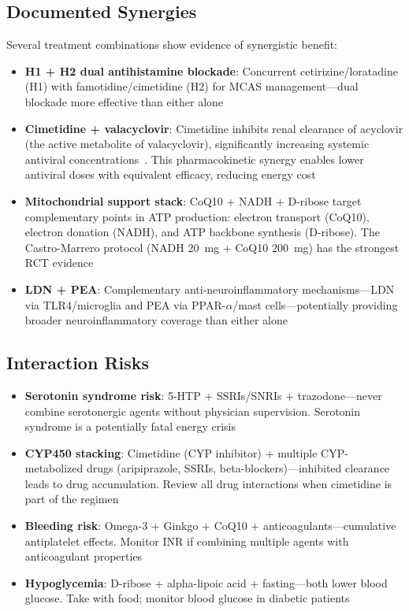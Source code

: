 \subsection{Documented Synergies}

Several treatment combinations show evidence of synergistic benefit:

\begin{itemize}
    \item \textbf{H1 + H2 dual antihistamine blockade}: Concurrent cetirizine/loratadine (H1) with famotidine/cimetidine (H2) for MCAS management---dual blockade more effective than either alone
    \item \textbf{Cimetidine + valacyclovir}: Cimetidine inhibits renal clearance of acyclovir (the active metabolite of valacyclovir), significantly increasing systemic antiviral concentrations~\cite{Stuijt2026CimetidineAcyclovir}. This pharmacokinetic synergy enables lower antiviral doses with equivalent efficacy, reducing energy cost
    \item \textbf{Mitochondrial support stack}: CoQ10 + NADH + D-ribose target complementary points in ATP production: electron transport (CoQ10), electron donation (NADH), and ATP backbone synthesis (D-ribose). The Castro-Marrero protocol (NADH 20~mg + CoQ10 200~mg) has the strongest RCT evidence~\cite{CastroMarrero2021fatigue}
    \item \textbf{LDN + PEA}: Complementary anti-neuroinflammatory mechanisms---LDN via TLR4/microglia and PEA via PPAR-$\alpha$/mast cells---potentially providing broader neuroinflammatory coverage than either alone
\end{itemize}

\subsection{Interaction Risks}

\begin{warning}
\label{warn:dangerous-combinations}
\begin{itemize}
    \item \textbf{Serotonin syndrome risk}: 5-HTP + SSRIs/SNRIs + trazodone---never combine serotonergic agents without physician supervision. Serotonin syndrome is a potentially fatal energy crisis
    \item \textbf{CYP450 stacking}: Cimetidine (CYP inhibitor) + multiple CYP-metabolized drugs (aripiprazole, SSRIs, beta-blockers)---inhibited clearance leads to drug accumulation. Review all drug interactions when cimetidine is part of the regimen
    \item \textbf{Bleeding risk}: Omega-3 + Ginkgo + CoQ10 + anticoagulants---cumulative antiplatelet effects. Monitor INR if combining multiple agents with anticoagulant properties
    \item \textbf{Hypoglycemia}: D-ribose + alpha-lipoic acid + fasting---both lower blood glucose. Take with food; monitor blood glucose in diabetic patients
\end{itemize}
\end{warning}

